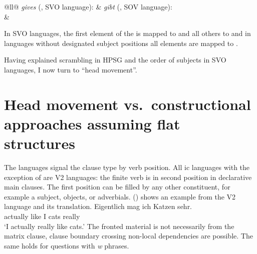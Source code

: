 \documentclass[output=paper
	        ,collection
	        ,collectionchapter
 	        ,biblatex
                ,babelshorthands
                ,newtxmath
                ,draftmode
                ,colorlinks, citecolor=brown
]{langscibook}
\begin{document}
\ea
\begin{tabular}[t]{@{}ll@{}}
\emph{gives} (, SVO language): & \emph{gibt} (, SOV language):\\
& 
\end{tabular}
\z
In SVO languages, the first element of the \argstl is mapped to \spr and all others to \comps and in
languages without designated subject positions all \argst elements are mapped to \comps.

Having explained scrambling in HPSG and the order of subjects in SVO languages, I now turn to ``head movement''.



\section{Head movement vs.\ constructional approaches assuming flat structures}
\label{sec-head-movement-vs-flat}


The  languages signal the clause type by verb position. All ic languages with the
exception of  are V2 languages: the finite verb is in second position in declarative main
clauses. The first position can be filled by any other constituent, for example a subject,
objects, or adverbials. () shows an example from the V2 language  and its  translation.
\ea 
\gll Eigentlich mag ich Katzen sehr.\\
     actually   like I cats really\\
\glt `I actually really like cats.'
\z
The fronted material is not necessarily from the matrix clause, clause boundary
crossing non-local dependencies are possible. The same holds for questions with \emph{w} phrases. 
\end{document}
